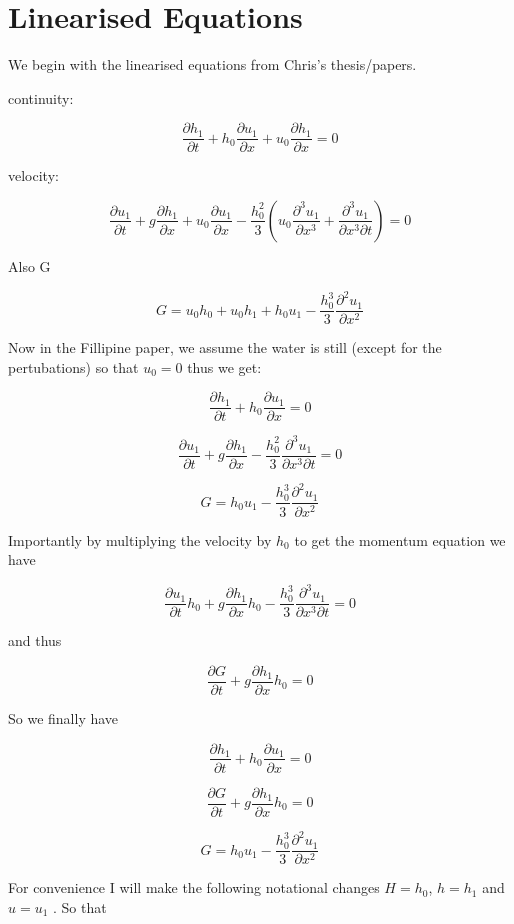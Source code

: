 \documentclass[12pt]{article}
\begin{document}
\section{Linearised Equations}

We begin with the linearised equations from Chris's thesis/papers.


continuity:

\[\frac{\partial  h_1}{\partial  t} + h_0\frac{\partial  u_1}{\partial  x} + u_0\frac{\partial  h_1}{\partial  x} = 0 \]

velocity:

\[\frac{\partial  u_1}{\partial  t} + g\frac{\partial  h_1}{\partial  x} + u_0\frac{\partial  u_1}{\partial  x} - \frac{h_0^2}{3}\left(u_0\frac{\partial^3  u_1}{\partial  x^3} + \frac{\partial^3  u_1}{\partial  x^3 \partial  t}  \right)  = 0 \]

Also G

\[G = u_0h_0 + u_0h_1 + h_0u_1 -\frac{h_0^3}{3} \frac{\partial^2 u_1}{\partial x^2}\]

Now in the Fillipine paper, we assume the water is still (except for the pertubations) so that $u_0 = 0$ thus we get:

\[\frac{\partial  h_1}{\partial  t} + h_0\frac{\partial  u_1}{\partial  x} = 0 \]

\[\frac{\partial  u_1}{\partial  t} + g\frac{\partial  h_1}{\partial  x}  - \frac{h_0^2}{3} \frac{\partial^3  u_1}{\partial  x^3 \partial  t}   = 0 \]

\[G = h_0u_1 -\frac{h_0^3}{3} \frac{\partial^2 u_1}{\partial x^2}\]

Importantly by multiplying the velocity by $h_0$ to get the momentum equation we have

\[\frac{\partial  u_1}{\partial  t}h_0 + g\frac{\partial  h_1}{\partial  x}h_0  - \frac{h_0^3}{3} \frac{\partial^3  u_1}{\partial  x^3 \partial  t}   = 0 \]

and thus

\[\frac{\partial  G}{\partial  t} + g\frac{\partial  h_1}{\partial  x}h_0   = 0 \]

So we finally have 

\[\frac{\partial  h_1}{\partial  t} + h_0\frac{\partial  u_1}{\partial  x} = 0 \]

\[\frac{\partial  G}{\partial  t} + g\frac{\partial  h_1}{\partial  x}h_0   = 0 \]

\[G = h_0u_1 -\frac{h_0^3}{3} \frac{\partial^2 u_1}{\partial x^2}\]

For convenience I will make the following notational changes $H = h_0$, $h = h_1$ and $u = u_1$ . So that 
\end{document}
